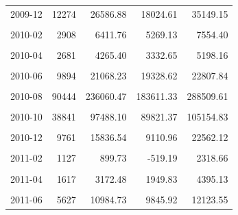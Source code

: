\begin{longtable}[t]{crrrr}
2009-12 & 12274 & 26586.88 & 18024.61 & 35149.15\\
\cellcolor{gray!10}{2010-01} & \cellcolor{gray!10}{3683} & \cellcolor{gray!10}{7051.36} & \cellcolor{gray!10}{5345.66} & \cellcolor{gray!10}{8757.06}\\
2010-02 & 2908 & 6411.76 & 5269.13 & 7554.40\\
\cellcolor{gray!10}{2010-03} & \cellcolor{gray!10}{2863} & \cellcolor{gray!10}{6463.95} & \cellcolor{gray!10}{5156.19} & \cellcolor{gray!10}{7771.72}\\
2010-04 & 2681 & 4265.40 & 3332.65 & 5198.16\\
\cellcolor{gray!10}{2010-05} & \cellcolor{gray!10}{4196} & \cellcolor{gray!10}{7858.41} & \cellcolor{gray!10}{7276.52} & \cellcolor{gray!10}{8440.30}\\
2010-06 & 9894 & 21068.23 & 19328.62 & 22807.84\\
\cellcolor{gray!10}{2010-07} & \cellcolor{gray!10}{21030} & \cellcolor{gray!10}{26603.48} & \cellcolor{gray!10}{21726.41} & \cellcolor{gray!10}{31480.54}\\
2010-08 & 90444 & 236060.47 & 183611.33 & 288509.61\\
\cellcolor{gray!10}{2010-09} & \cellcolor{gray!10}{109030} & \cellcolor{gray!10}{349360.06} & \cellcolor{gray!10}{314425.19} & \cellcolor{gray!10}{384294.94}\\
2010-10 & 38841 & 97488.10 & 89821.37 & 105154.83\\
\cellcolor{gray!10}{2010-11} & \cellcolor{gray!10}{24052} & \cellcolor{gray!10}{53509.26} & \cellcolor{gray!10}{44556.25} & \cellcolor{gray!10}{62462.28}\\
2010-12 & 9761 & 15836.54 & 9110.96 & 22562.12\\
\cellcolor{gray!10}{2011-01} & \cellcolor{gray!10}{1888} & \cellcolor{gray!10}{276.83} & \cellcolor{gray!10}{-2362.81} & \cellcolor{gray!10}{2916.46}\\
2011-02 & 1127 & 899.73 & -519.19 & 2318.66\\
\cellcolor{gray!10}{2011-03} & \cellcolor{gray!10}{1265} & \cellcolor{gray!10}{-892.09} & \cellcolor{gray!10}{-3121.24} & \cellcolor{gray!10}{1337.07}\\
2011-04 & 1617 & 3172.48 & 1949.83 & 4395.13\\
\cellcolor{gray!10}{2011-05} & \cellcolor{gray!10}{2625} & \cellcolor{gray!10}{4821.70} & \cellcolor{gray!10}{4003.48} & \cellcolor{gray!10}{5639.92}\\
2011-06 & 5627 & 10984.73 & 9845.92 & 12123.55\\

\end{longtable}
